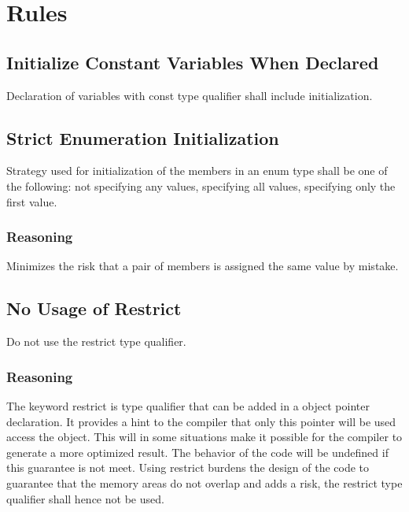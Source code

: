 \documentclass{report}
\newcommand\codelstwidth{0.48}
\newcounter{Rule}
\begin{document}
\section{Rules}



\subsection{Initialize Constant Variables When Declared}

Declaration of variables with const type qualifier shall include initialization.

\subsection{Strict Enumeration Initialization}

Strategy used for initialization of the members in an enum type shall be one of the following: not specifying any values, specifying all values, specifying only the first value.

\subsubsection{Reasoning}

Minimizes the risk that a pair of members is assigned the same value by mistake.

\noindent
\begin{minipage}[t]{\codelstwidth\linewidth}

\end{minipage}
\hfill
\begin{minipage}[t]{\codelstwidth\linewidth}

\end{minipage}

\subsection{No Usage of Restrict}

Do not use the restrict type qualifier.

\subsubsection{Reasoning}

The keyword restrict is type qualifier that can be added in a object pointer declaration. It provides a hint to the compiler that only this pointer will be used access the object. This will in some situations make it possible for the compiler to generate a more optimized result. The behavior of the code will be undefined if this guarantee is not meet. Using restrict burdens the design of the code to guarantee that the memory areas do not overlap and adds a risk, the restrict type qualifier shall hence not be used.
\end{document}
